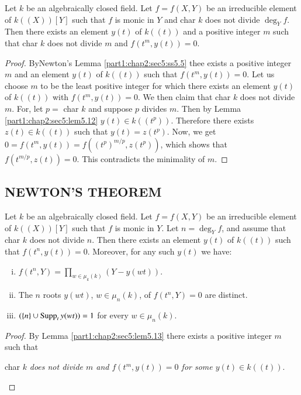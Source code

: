 \begin{lemma}\label{part1:chap2:sec5:lem5.13}
  Let $k$ be an algebraically closed field. Let $f = f(X, Y)$ be an irreducible element of $k((X))[Y]$ such that $f$ is monic in $Y$ and char $k$ does not divide $\deg_Y f$. Then there exists an element $y(t)$ of $k((t))$ and a positive integer $m$ such that char $k$ does not divide $m$ and $f(t^m, y (t))=0$.
\end{lemma}

\begin{proof}
  By\pageoriginale Newton's Lemma \ref{part1:chap2:sec5:ss5.5} thee exists a positive integer $m$ and an element $y(t)$ of $k((t))$ such that $f(t^m, y(t))=0$. Let us choose $m$ to be the least positive integer for which there exists an element $y(t)$ of $k((t))$ with $f(t^m, y(t))=0$. We then claim that char $k$ does not divide $m$. For, let $p=$ char $k$ and suppose $p$ divides $m$. Then by Lemma \ref{part1:chap2:sec5:lem5.12} $y(t) \in k ((t^p))$. Therefore there exists $z(t) \in k((t))$ such that $y(t)= z(t^p)$. Now, we get $0= f(t^m, y(t))= f((t^p)^{m/p}, z(t^p))$, which shows that $f(t^{m/p}, z(t))=0$. This contradicts the minimality of $m$.
\end{proof}

\setcounter{subsection}{13}
\setcounter{mysubsection}{13}
\subsection{NEWTON'S THEOREM}\label{part1:chap2:sec5:ss5.14}
  Let $k$ be an algebraically closed field. Let $f=f(X, Y)$ be an irreducible element of $k((X))[Y]$ such that $f$ is monic in $Y$. Let $n= \deg _Y f$, and assume that char $k$ does not divide $n$. Then there exists an element $y(t)$ of $k((t))$ such that $f(t^n, y(t))=0$. Moreover, for any such $y(t)$ we have: 
\begin{enumerate}[(i)]
\item $f(t^n, Y)= \displaystyle{\prod_{w \in \mu_k (k)}} (Y- y(w t))$.
\item The $n$ roots $y(wt)$, $w \in \mu_n(k)$, of $f(t^n, Y)=0$ are distinct.
\item \gcd $(\{ n\}\cup \operatorname{Supp}_t y(wt))=1$ for every $w \in \mu_n (k)$.
\end{enumerate}

\begin{proof}
 By Lemma \ref{part1:chap2:sec5:lem5.13} there exists a positive integer $m$ such that 
\begin{claim}\label{part1:chap2:sec5:ss5.14:sss5.14.1}
  char $k$ {\em does not divide $m$ and $f(t^m, y(t))=0$ for some $y(t) \in k ((t))$}.
\end{claim}
\end{proof}

